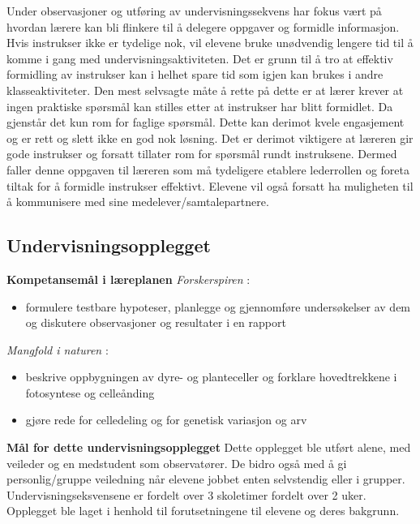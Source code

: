 \documentclass[main.tex]{subfiles}
\begin{document}
Under observasjoner og 
utføring av undervisningssekvens har fokus vært på hvordan 
lærere kan bli flinkere til å delegere oppgaver og formidle 
informasjon. Hvis instrukser ikke er tydelige nok, vil elevene bruke unødvendig 
lengere tid til å komme i gang med undervisningsaktiviteten. Det 
er grunn til å tro at effektiv formidling av instrukser kan i 
helhet spare tid som igjen kan brukes i andre klasseaktiviteter. Den mest selvsagte måte
å rette på dette er at lærer krever at ingen praktiske
spørsmål kan stilles etter at instrukser har blitt formidlet. Da gjenstår
det kun rom for faglige spørsmål. Dette kan derimot kvele engasjement og er
rett og slett ikke en god nok løsning. Det er derimot viktigere at læreren
gir gode instrukser og forsatt tillater rom for spørsmål rundt instruksene.
Dermed faller denne oppgaven til læreren som må tydeligere
etablere lederrollen og foreta tiltak for å formidle instrukser 
effektivt. Elevene vil også forsatt ha muligheten til å kommunisere med sine 
medelever/samtalepartnere.

\subsection*{Undervisningsopplegget}
\textbf{Kompetansemål i læreplanen}
\newline
\emph{Forskerspiren} :
\begin{itemize}
\item formulere testbare hypoteser, planlegge og gjennomføre undersøkelser 
av dem og diskutere observasjoner og resultater i en rapport
\end{itemize}
\emph{Mangfold i naturen} :
\begin{itemize}
\item beskrive oppbygningen av dyre- og planteceller og forklare hovedtrekkene i fotosyntese og celleånding
\item gjøre rede for celledeling og for genetisk variasjon og arv
\end{itemize}
\textbf{Mål for dette undervisningsopplegget}
\newline
Dette opplegget ble utført alene, med veileder og en medstudent som observatører. 
De bidro også med å gi personlig/gruppe veiledning når elevene jobbet enten selvstendig eller i grupper. 
Undervisningseksvensene er fordelt over 3 skoletimer fordelt over 2 uker. Opplegget ble laget i henhold til 
forutsetningene til elevene og deres bakgrunn. 
\end{document}
